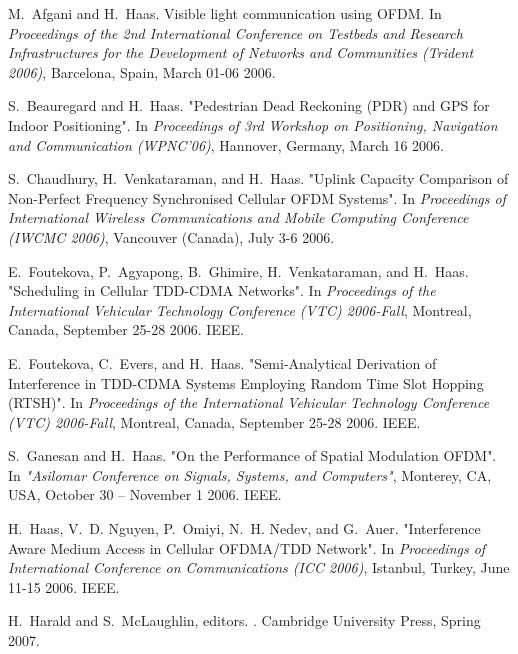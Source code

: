 \begin{bibunit}[hplain]
\begin{thebibliography}{1}

M.~Afgani and H.~Haas.
\newblock Visible light communication using {OFDM}.
\newblock In {\em Proceedings of the 2nd International Conference on Testbeds
  and Research Infrastructures for the Development of Networks and Communities
  (Trident 2006)}, Barcelona, Spain, March 01-06 2006.

S.~Beauregard and H.~Haas.
\newblock "{Pedestrian Dead Reckoning (PDR) and GPS for Indoor Positioning}".
\newblock In {\em Proceedings of 3rd Workshop on Positioning, Navigation and
  Communication ({WPNC}'06)}, Hannover, Germany, March 16 2006.

S.~Chaudhury, H.~Venkataraman, and H.~Haas.
\newblock "{Uplink Capacity Comparison of Non-Perfect Frequency Synchronised
  Cellular OFDM Systems}".
\newblock In {\em Proceedings of International Wireless Communications and
  Mobile Computing Conference ({IWCMC} 2006)}, Vancouver (Canada), July 3-6
  2006.

E.~Foutekova, P.~Agyapong, B.~Ghimire, H.~Venkataraman, and H.~Haas.
\newblock "{Scheduling in Cellular TDD-CDMA Networks}".
\newblock In {\em Proceedings of the International Vehicular Technology
  Conference ({VTC}) 2006-Fall}, Montreal, Canada, September 25-28 2006. IEEE.

E.~Foutekova, C.~Evers, and H.~Haas.
\newblock "{Semi-Analytical Derivation of Interference in TDD-CDMA Systems
  Employing Random Time Slot Hopping (RTSH)}".
\newblock In {\em Proceedings of the International Vehicular Technology
  Conference ({VTC}) 2006-Fall}, Montreal, Canada, September 25-28 2006. IEEE.

S.~Ganesan and H.~Haas.
\newblock "{On the Performance of Spatial Modulation OFDM}".
\newblock In {\em "{Asilomar Conference on Signals, Systems, and Computers}"},
  Monterey, CA, USA, October 30 -- November 1 2006. IEEE.

H.~Haas, V.~D. Nguyen, P.~Omiyi, N.~H. Nedev, and G.~Auer.
\newblock "{Interference Aware Medium Access in Cellular OFDMA/TDD Network}".
\newblock In {\em Proceedings of International Conference on Communications
  ({ICC} 2006)}, Istanbul, Turkey, June 11-15 2006. IEEE.

H.~Harald and S.~McLaughlin, editors.
.
\newblock Cambridge University Press, Spring 2007.


\end{thebibliography}
\end{bibunit}

